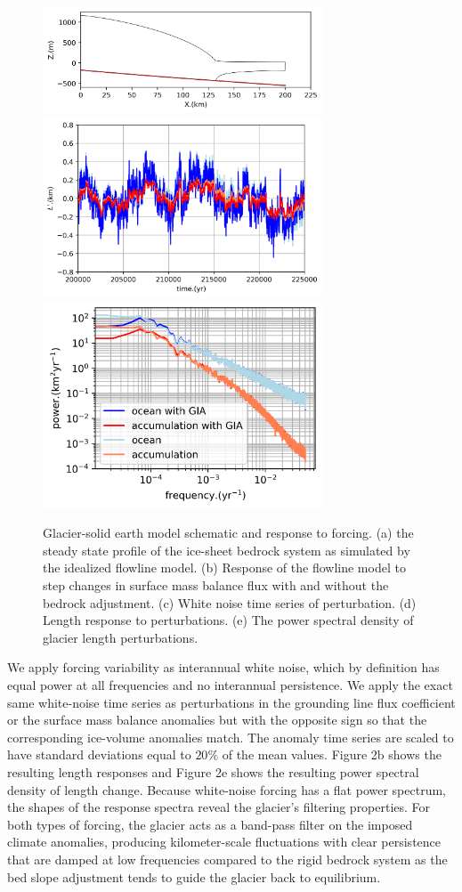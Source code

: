 \documentclass[tc, manuscript]{copernicus}
\begin{document}
\begin{figure}[t]
\includegraphics[width=8.3cm]{../figures/overview.png}
\includegraphics[width=8.3cm]{../figures/length_perturbation_timeseries.png}
\includegraphics[width=8.3cm]{../figures/power_spectra.png}
\caption{ Glacier-solid earth model schematic and response to forcing. (a) the steady state profile of the ice-sheet bedrock system as simulated by the idealized flowline model. (b) Response of the flowline model to step changes in surface mass balance flux with and without the bedrock adjustment. (c) White noise time series of perturbation. (d) Length response to perturbations. (e) The power spectral density of glacier length perturbations.}
\end{figure}



We apply forcing variability as interannual white noise, which by definition has equal power at all frequencies and no interannual persistence. We apply the exact same white-noise time series as perturbations in the grounding line flux coefficient or the surface mass balance anomalies but with the opposite sign so that the corresponding ice-volume anomalies match. The anomaly time series are scaled to have standard deviations equal to $20\%$ of the mean values. Figure 2b shows the resulting length responses and Figure 2e shows the resulting power spectral density of length change.  
Because white-noise forcing has a flat power spectrum, the shapes of the response spectra reveal the glacier's filtering properties.
For both types of forcing, the glacier acts as a band-pass filter on the imposed climate anomalies, producing kilometer-scale fluctuations with clear persistence that are damped at low frequencies compared to the rigid bedrock system as the bed slope adjustment tends to guide the glacier back to equilibrium.
\end{document}
